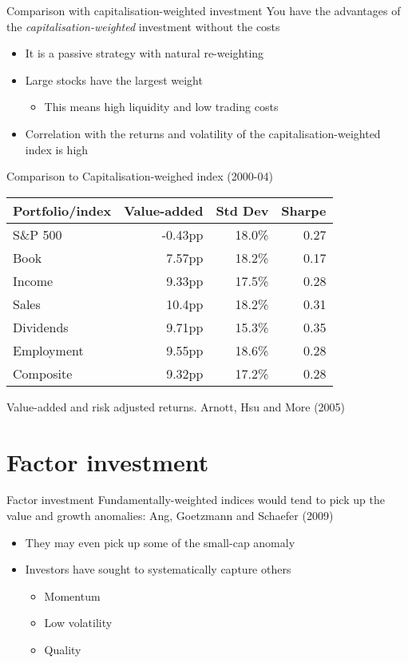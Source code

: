 \documentclass[14pt,xcolor=pdftex,dvipsnames,table]{beamer}\usepackage[]{graphicx}\usepackage[]{color}
\begin{document}
\begin{frame}{Comparison with capitalisation-weighted investment}
You have the advantages of the \emph{capitalisation-weighted} investment without the costs
\begin{itemize}[<+-| alert@+>]
\pause
\item It is a passive strategy with natural re-weighting
\item Large stocks have the largest weight
\begin{itemize}
\item This means high liquidity and low trading costs
\end{itemize}
\item Correlation with the returns and volatility of the capitalisation-weighted index is high
\end{itemize}
\end{frame}

\begin{frame}{Comparison to Capitalisation-weighed index (2000-04)}
\begin{table}
\begin{center}
\begin{tabular}{l r r r}
\textbf{Portfolio/index} & \textbf{Value-added} & \textbf{Std Dev} &  \textbf{Sharpe}\\
\hline
S\&P 500 & -0.43pp & 18.0\%& 0.27 \\
Book &      7.57pp&  18.2\%& 0.17\\
Income &    9.33pp&  17.5\%& 0.28 \\
Sales &     10.4pp&  18.2\%& 0.31 \\
Dividends & 9.71pp&  15.3\%& 0.35 \\
Employment & 9.55pp& 18.6\%& 0.28\\
Composite &  9.32pp& 17.2\%& 0.28 
\end{tabular}
\end{center}
\end{table}
Value-added and risk adjusted returns.  Arnott, Hsu and More (2005)
\end{frame}

\section{Factor investment}
\begin{frame}{Factor investment}
Fundamentally-weighted indices would tend to pick up the value and growth anomalies: Ang, Goetzmann and Schaefer (2009)
\begin{itemize}[<+-| alert@+>]
\pause
\item They may even pick up some of the small-cap anomaly
\item Investors have sought to systematically capture others
\begin{itemize}
\item Momentum
\item Low volatility 
\item Quality
\end{itemize}
\end{itemize}
\end{frame}
\end{document}
